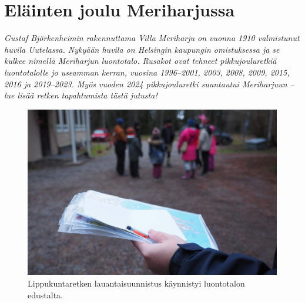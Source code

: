 \section{Eläinten joulu Meriharjussa}

\textit{Gustaf Björkenheimin rakennuttama Villa Meriharju on vuonna 1910 
valmistunut huvila Uutelassa. Nykyään huvila on Helsingin kaupungin 
omistuksessa ja se kulkee nimellä Meriharjun luontotalo. Rusakot ovat tehneet 
pikkujouluretkiä luontotalolle jo useamman kerran, vuosina 1996--2001, 2003, 
2008, 2009, 2015, 2016 ja 2019--2023. Myös vuoden 2024 pikkujouluretki 
suuntautui Meriharjuun -- lue lisää retken tapahtumista tästä jutusta!}

\begin{figure}[!b]
\centering\includegraphics[width=\textwidth]{assets/meriharjuSuunnistus}
\caption{Lippukuntaretken lauantaisuunnistus käynnistyi luontotalon edustalta.}
\end{figure}

